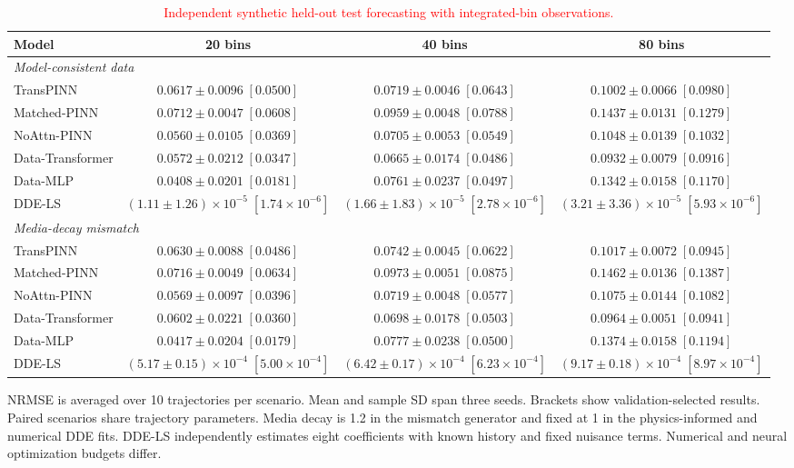 \begin{table}[t]
\centering
\caption{\textcolor{red}{Independent synthetic held-out test forecasting with integrated-bin observations.}}
\label{tab:synthetic_forecast}
\footnotesize
\setlength{\tabcolsep}{4pt}
\renewcommand{\arraystretch}{1.08}
\begin{tabular*}{\textwidth}{@{\extracolsep{\fill}}lccc@{}}
\toprule
Model & 20 bins & 40 bins & 80 bins \\
\midrule
\multicolumn{4}{l}{\textit{Model-consistent data}} \\
TransPINN & $0.0617\pm0.0096\;[0.0500]$ & $0.0719\pm0.0046\;[0.0643]$ & $0.1002\pm0.0066\;[0.0980]$ \\
Matched-PINN & $0.0712\pm0.0047\;[0.0608]$ & $0.0959\pm0.0048\;[0.0788]$ & $0.1437\pm0.0131\;[0.1279]$ \\
NoAttn-PINN & $0.0560\pm0.0105\;[0.0369]$ & $0.0705\pm0.0053\;[0.0549]$ & $0.1048\pm0.0139\;[0.1032]$ \\
Data-Transformer & $0.0572\pm0.0212\;[0.0347]$ & $0.0665\pm0.0174\;[0.0486]$ & $0.0932\pm0.0079\;[0.0916]$ \\
Data-MLP & $0.0408\pm0.0201\;[0.0181]$ & $0.0761\pm0.0237\;[0.0497]$ & $0.1342\pm0.0158\;[0.1170]$ \\
DDE-LS & $(1.11\pm1.26)\times10^{-5}\;[1.74\times10^{-6}]$ & $(1.66\pm1.83)\times10^{-5}\;[2.78\times10^{-6}]$ & $(3.21\pm3.36)\times10^{-5}\;[5.93\times10^{-6}]$ \\
\midrule
\multicolumn{4}{l}{\textit{Media-decay mismatch}} \\
TransPINN & $0.0630\pm0.0088\;[0.0486]$ & $0.0742\pm0.0045\;[0.0622]$ & $0.1017\pm0.0072\;[0.0945]$ \\
Matched-PINN & $0.0716\pm0.0049\;[0.0634]$ & $0.0973\pm0.0051\;[0.0875]$ & $0.1462\pm0.0136\;[0.1387]$ \\
NoAttn-PINN & $0.0569\pm0.0097\;[0.0396]$ & $0.0719\pm0.0048\;[0.0577]$ & $0.1075\pm0.0144\;[0.1082]$ \\
Data-Transformer & $0.0602\pm0.0221\;[0.0360]$ & $0.0698\pm0.0178\;[0.0503]$ & $0.0964\pm0.0051\;[0.0941]$ \\
Data-MLP & $0.0417\pm0.0204\;[0.0179]$ & $0.0777\pm0.0238\;[0.0500]$ & $0.1374\pm0.0158\;[0.1194]$ \\
DDE-LS & $(5.17\pm0.15)\times10^{-4}\;[5.00\times10^{-4}]$ & $(6.42\pm0.17)\times10^{-4}\;[6.23\times10^{-4}]$ & $(9.17\pm0.18)\times10^{-4}\;[8.97\times10^{-4}]$ \\
\bottomrule
\end{tabular*}
\par\smallskip
\begin{minipage}{\textwidth}\footnotesize NRMSE is averaged over 10 trajectories per scenario. Mean and sample SD span three seeds. Brackets show validation-selected results. Paired scenarios share trajectory parameters. Media decay is 1.2 in the mismatch generator and fixed at 1 in the physics-informed and numerical DDE fits. DDE-LS independently estimates eight coefficients with known history and fixed nuisance terms. Numerical and neural optimization budgets differ.\end{minipage}
\end{table}
